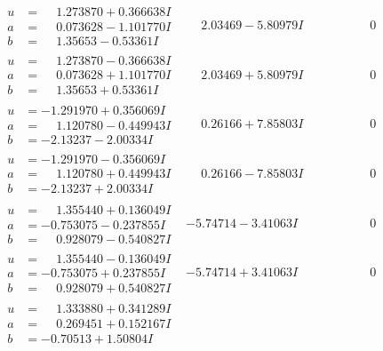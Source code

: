 \documentclass[1p]{elsarticle_modified}
\theoremstyle{definition}
\begin{document}
$$\begin{array}{c|c|c}
\begin{aligned}
u &= \phantom{-}1.273870 + 0.366638 I \\
a &= \phantom{-}0.073628 - 1.101770 I \\
b &= \phantom{-}1.35653 - 0.53361 I\end{aligned}
 & \phantom{-}2.03469 - 5.80979 I & \phantom{-0.000000 } 0 \\ \hline\begin{aligned}
u &= \phantom{-}1.273870 - 0.366638 I \\
a &= \phantom{-}0.073628 + 1.101770 I \\
b &= \phantom{-}1.35653 + 0.53361 I\end{aligned}
 & \phantom{-}2.03469 + 5.80979 I & \phantom{-0.000000 } 0 \\ \hline\begin{aligned}
u &= -1.291970 + 0.356069 I \\
a &= \phantom{-}1.120780 - 0.449943 I \\
b &= -2.13237 - 2.00334 I\end{aligned}
 & \phantom{-}0.26166 + 7.85803 I & \phantom{-0.000000 } 0 \\ \hline\begin{aligned}
u &= -1.291970 - 0.356069 I \\
a &= \phantom{-}1.120780 + 0.449943 I \\
b &= -2.13237 + 2.00334 I\end{aligned}
 & \phantom{-}0.26166 - 7.85803 I & \phantom{-0.000000 } 0 \\ \hline\begin{aligned}
u &= \phantom{-}1.355440 + 0.136049 I \\
a &= -0.753075 - 0.237855 I \\
b &= \phantom{-}0.928079 - 0.540827 I\end{aligned}
 & -5.74714 - 3.41063 I & \phantom{-0.000000 } 0 \\ \hline\begin{aligned}
u &= \phantom{-}1.355440 - 0.136049 I \\
a &= -0.753075 + 0.237855 I \\
b &= \phantom{-}0.928079 + 0.540827 I\end{aligned}
 & -5.74714 + 3.41063 I & \phantom{-0.000000 } 0 \\ \hline\begin{aligned}
u &= \phantom{-}1.333880 + 0.341289 I \\
a &= \phantom{-}0.269451 + 0.152167 I \\
b &= -0.70513 + 1.50804 I\end{aligned}

\end{array}$$
\end{document}
